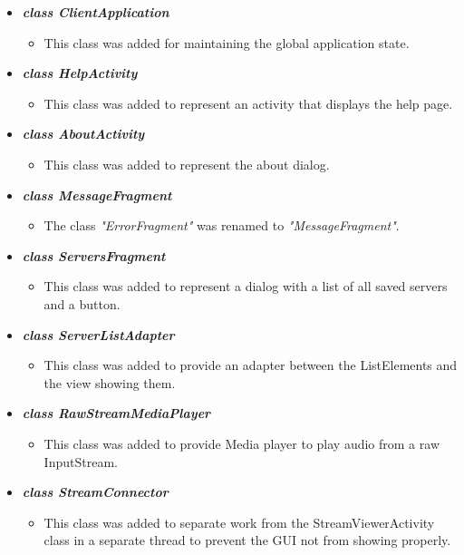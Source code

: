 \documentclass[a4paper,10pt]{scrartcl}
\begin{document}
\begin{itemize}
    \item \textbf{\textit{class ClientApplication}}
  \begin{itemize}
   \item This class was added for maintaining the global application state.
  \end{itemize}

  \item \textbf{\textit{class HelpActivity}}
  \begin{itemize}
   \item This class was added to represent an activity that displays the help page.
  \end{itemize}

  \item \textbf{\textit{class AboutActivity}}
  \begin{itemize}
   \item This class was added to represent the about dialog.
  \end{itemize}

   \item \textbf{\textit{class MessageFragment}}
  \begin{itemize}
   \item The class \textit{"ErrorFragment"} was renamed to \textit{"MessageFragment"}.
  \end{itemize}

  \item \textbf{\textit{class ServersFragment}}
  \begin{itemize}
   \item This class was added to represent a dialog with a list of all saved servers and a button.
  \end{itemize}

  \item \textbf{\textit{class ServerListAdapter}}
  \begin{itemize}
  \item This class was added to provide an adapter between the ListElements and the view showing them.
  \end{itemize}

  \item \textbf{\textit{class RawStreamMediaPlayer}}
  \begin{itemize}
  \item This class was added to provide Media player to play audio from a raw InputStream.
  \end{itemize}

    \item \textbf{\textit{class StreamConnector}}
  \begin{itemize}
   \item This class was added to separate work from the StreamViewerActivity class
  in a separate thread to prevent the GUI not from showing properly.
  \end{itemize}

\end{itemize}
\end{document}
